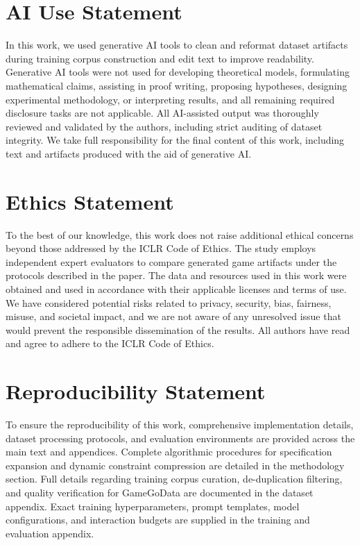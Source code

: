 \documentclass{article}
\begin{document}
\section*{AI Use Statement}
In this work, we used generative AI tools to clean and reformat dataset artifacts during training corpus construction and edit text to improve readability. Generative AI tools were not used for developing theoretical models, formulating mathematical claims, assisting in proof writing, proposing hypotheses, designing experimental methodology, or interpreting results, and all remaining required disclosure tasks are not applicable. All AI-assisted output was thoroughly reviewed and validated by the authors, including strict auditing of dataset integrity. We take full responsibility for the final content of this work, including text and artifacts produced with the aid of generative AI.

\section*{Ethics Statement}

To the best of our knowledge, this work does not raise additional ethical concerns beyond those addressed by the ICLR Code of Ethics. The study employs independent expert evaluators to compare generated game artifacts under the protocols described in the paper. The data and resources used in this work were obtained and used in accordance with their applicable licenses and terms of use. We have considered potential risks related to privacy, security, bias, fairness, misuse, and societal impact, and we are not aware of any unresolved issue that would prevent the responsible dissemination of the results. All authors have read and agree to adhere to the ICLR Code of Ethics.

\section*{Reproducibility Statement}
To ensure the reproducibility of this work, comprehensive implementation details, dataset processing protocols, and evaluation environments are provided across the main text and appendices. Complete algorithmic procedures for specification expansion and dynamic constraint compression are detailed in the methodology section. Full details regarding training corpus curation, de-duplication filtering, and quality verification for GameGoData are documented in the dataset appendix. Exact training hyperparameters, prompt templates, model configurations, and interaction budgets are supplied in the training and evaluation appendix.
\end{document}
